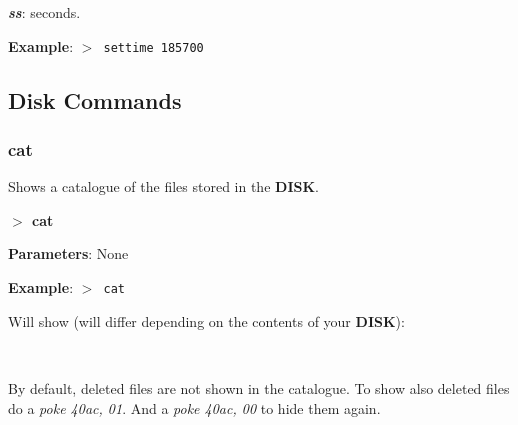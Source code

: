 \documentclass[a4paper,11pt]{article}
\begin{document}
        \hspace{1cm}\textbf{\textit{ss}}: seconds.

        \textbf{Example}: \texttt{$>$ settime 185700}

    \subsection{Disk Commands}\label{dskcmds}
        \subsubsection{{\color{blue}cat}}
        Shows a catalogue of the files stored in the \textbf{DISK}.

        \hspace{1.9cm}\textbf{$>$ cat}

        \textbf{Parameters}: None

        \textbf{Example}: \texttt{$>$ cat}

        Will show (will differ depending on the contents of your \textbf{DISK}):

        \texttt{
        }

        By default, deleted files are not shown in the catalogue. To show also
        deleted files do a \textit{poke 40ac, 01}. And a \textit{poke 40ac, 00}
        to hide them again.
\end{document}
